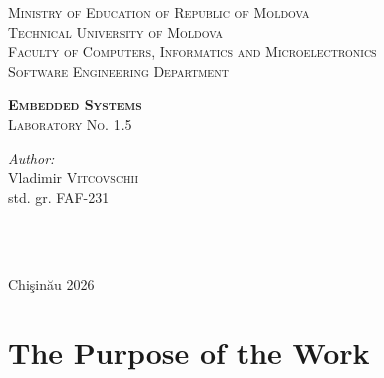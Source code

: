 \documentclass[12pt]{article}
\begin{document}
\begin{titlepage}
   \begin{center}
    \textsc{\large Ministry of Education of Republic of Moldova}\\[0.5cm]
    \textsc{\large Technical University of Moldova}\\[0.5cm]
    \textsc{\large Faculty of Computers, Informatics and Microelectronics}\\[0.5cm]
    \textsc{\large Software Engineering Department}\\[1.2cm]

    \vspace{25mm}

    {\LARGE \textbf{\textsc{Embedded Systems}}}\\[0.5cm]
    \textsc{\large Laboratory No. 1.5}\\[0.5cm]

    \newcommand{\HRule}{\rule{\linewidth}{0.5mm}}
    \vspace{80mm}

    \begin{minipage}[t]{0.4\textwidth}
    \begin{flushleft} \large
    \emph{Author:} \\
    Vladimir \textsc{Vitcovschii}\\
    std. gr. FAF-231
    \end{flushleft}
    \end{minipage}
    ~
    \begin{minipage}[t]{0.4\textwidth}
    \begin{flushright} \large
    \end{flushright}
    \end{minipage}\\[3cm]

    \vspace{5mm}
    \large Chi\c{s}in\u{a}u 2026\\[0.5cm]

    \vfill
    \end{center}
\end{titlepage}

\clearpage
\tableofcontents
\clearpage

\setcounter{page}{2}
\pagestyle{fancy}
\fancyhf{}
\rhead{\thepage}

\section{The Purpose of the Work}
\end{document}
